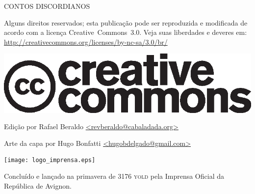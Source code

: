 \thispagestyle{empty}
\begin{center}
{\tiny
CONTOS DISCORDIANOS

\vspace{.5cm}

\begin{minipage}[h]{.6\textwidth}
Alguns direitos reservados; esta publicação pode ser reproduzida e modificada de acordo com a licença \foreignlanguage{english}{Creative~Commons~3.0}. Veja suas liberdades e deveres em: \url{http://creativecommons.org/licenses/by-nc-sa/3.0/br/}
	\begin{center}
	\includegraphics[scale=.2]{cc.eps}
	\end{center}
\end{minipage}

\vspace{.5cm}

\begin{minipage}[h]{.6\textwidth}
Edição por Rafael Beraldo \url{<revberaldo@cabaladada.org>}

Arte da capa por Hugo Bonfatti \url{<hugobdelgado@gmail.com>}
\end{minipage}

\vfill

\begin{minipage}[h]{.6\textwidth}
\centering
	\texttt{[image: logo\_imprensa.eps]}

Concluído e lançado na primavera de 3176 \textsc{yold} pela Imprensa Oficial da República de Avignon.
\end{minipage}
}
\end{center}
\newpage

